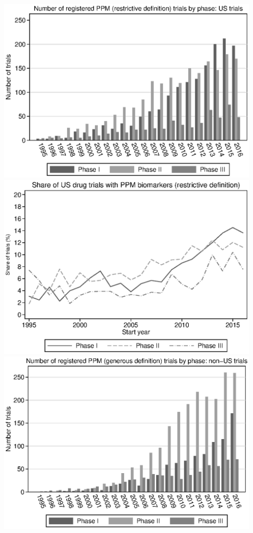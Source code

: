 \includegraphics{../figures/07c-r_ppm_count_by_phase_us.eps}
\includegraphics{../figures/07d-r_ppm_share_by_phase_us.eps}
\includegraphics{../figures/08a-g_ppm_count_by_phase_non-us.eps}
